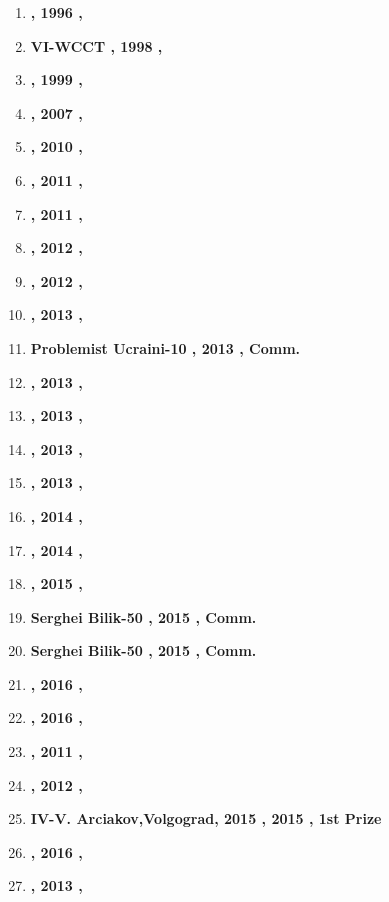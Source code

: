 \begin{enumerate}
\item \textbf{ , 1996 , }
\item \textbf{ VI-WCCT , 1998 , }
\item \textbf{ , 1999 , }
\item \textbf{ , 2007 , }
\item \textbf{ , 2010 , }
\item \textbf{ , 2011 , }
\item \textbf{ , 2011 , }
\item \textbf{ , 2012 , }
\item \textbf{ , 2012 , }
\item \textbf{ , 2013 , }
\item \textbf{ Problemist Ucraini-10 , 2013 , Comm. }
\item \textbf{ , 2013 , }
\item \textbf{ , 2013 , }
\item \textbf{ , 2013 , }
\item \textbf{ , 2013 , }
\item \textbf{ , 2014 , }
\item \textbf{ , 2014 , }
\item \textbf{ , 2015 , }
\item \textbf{ Serghei Bilik-50 , 2015 , Comm. }
\item \textbf{ Serghei Bilik-50 , 2015 , Comm. }
\item \textbf{ , 2016 , }
\item \textbf{ , 2016 , }
\item \textbf{ , 2011 , }
\item \textbf{ , 2012 , }
\item \textbf{ IV-V. Arciakov,Volgograd, 2015 , 2015 , 1st Prize }
\item \textbf{ , 2016 , }
\item \textbf{ , 2013 , }

\end{enumerate}